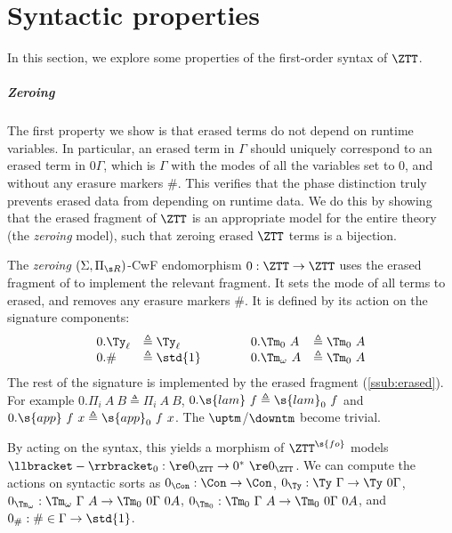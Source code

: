 \documentclass[a4paper,UKenglish,cleveref,autoref,thm-restate]{lipics-v2021}
\begin{document}
\section{Syntactic properties}\label{sec:models-of-itt}

In this section, we explore some properties of the first-order syntax of $\ZTT$.

\subparagraph{Zeroing}
The first property we show is that erased terms do not depend on runtime
variables. In particular, an erased term in $\Gamma$ should uniquely correspond
to an erased term in $0\Gamma$, which is $\Gamma$ with the modes of all the
variables set to 0, and without any erasure markers $\#$. This verifies that the
phase distinction truly prevents erased data from depending on runtime data. We
do this by showing that the erased fragment of $\ZTT$ is an appropriate model
for the entire theory (the \emph{zeroing} model), such that zeroing erased $\ZTT$
terms is a bijection.

\begin{definition}\label{def:zeroing-model}
  The \emph{zeroing}
  $(\Sigma, \Pi_{\s R})$-CwF endomorphism $0 : \ZTT \to \ZTT$ uses the erased fragment of
  \ZTT to implement the relevant fragment. It sets the mode of all terms to
  erased, and removes any erasure markers $\#$. It is defined by its action on the signature components:
  \[\begin{array}{ll@{\qquad\qquad}ll}
  0.\Ty_\ell      &\triangleq \Ty_\ell  &
  0.\Tm_0\ A      &\triangleq \Tm_0\ A  \\
  0.\#            &\triangleq \std{1}  &
  0.\Tm_\omega\ A &\triangleq \Tm_0\ A
  \end{array}\]
  The rest of the signature is implemented by the erased fragment (\cref{ssub:erased}).
  For example $0.\Pi_i\ A\ B \triangleq \Pi_i\ A\ B$, $0.\s{lam}\ f
  \triangleq \s{lam}_0\ f$ and $0.\s{app}\ f\ x \triangleq \s{app}_0\ f\ x$. The
  $\uptm$/$\downtm$ become trivial.
\end{definition}

By acting on the syntax, this yields a morphism of $\ZTT^{\s{fo}}$ models $\llbracket-\rrbracket_0 : \re 0_{\ZTT}
\to 0^*\ \re 0_{\ZTT}$. We can compute the actions on syntactic sorts as
$0_{\Con} : \Con \to \Con$,
$0_{\Ty} : \Ty\ \Gamma \to \Ty\ 0\Gamma$,
$0_{\Tm_\omega} : \Tm_\omega\ \Gamma\ A \to \Tm_0\ 0\Gamma\ 0A$,
$0_{\Tm_0} : \Tm_0\ \Gamma\ A \to \Tm_0\ 0\Gamma\ 0A$,
and
$0_{\#} : \# \in \Gamma \to \std{1}$.
\end{document}
